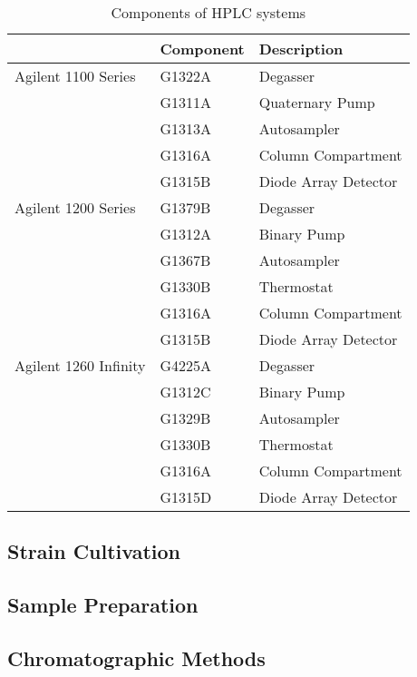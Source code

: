 \begin{table}[H]
	\caption{Components of HPLC systems}
	\label{tab:HPLCtab}
	\centering
	\begin{tabularx}{\textwidth}{XXX}
						& \textbf{Component}		& \textbf{Description}	\\
		\midrule
		Agilent 1100 Series		&	G1322A		&	Degasser			\\
								&	G1311A		&	Quaternary Pump		\\
								&	G1313A		&	Autosampler			\\
								&	G1316A		&	Column Compartment	\\
								&	G1315B		&	Diode Array Detector	\\
		Agilent 1200 Series		&	G1379B		&	Degasser			\\
								&	G1312A		&	Binary Pump			\\
								&	G1367B		&	Autosampler			\\
								&	G1330B		&	Thermostat			\\
								&	G1316A		&	Column Compartment	\\
								&	G1315B		&	Diode Array Detector	\\
		Agilent 1260 Infinity	&	G4225A		&	Degasser			\\
								&	G1312C		&	Binary Pump			\\
								&	G1329B		&	Autosampler			\\
								&	G1330B		&	Thermostat			\\
								&	G1316A		&	Column Compartment	\\
								&	G1315D		&	Diode Array Detector	\\


		\bottomrule
	\end{tabularx}
\end{table}
\subsection{Strain Cultivation} %
\label{sec:strain_cultivation}

\subsection{Sample Preparation} %
\label{sec:sample_preparation}

\subsection{Chromatographic Methods} %
\label{sec:chromatographic_methods}

